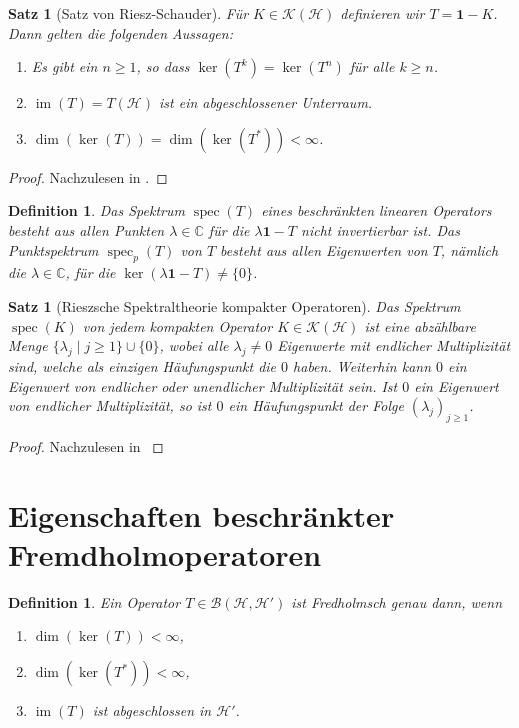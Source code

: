 \documentclass[11pt, hidelinks]{article}
\newcommand{\h}{\mathcal{H}}
\newcommand{\spec}{\operatorname{spec}}
\newcommand{\im}{\operatorname{im}}
\numberwithin{conj}{section}
\newtheorem{definition}[conj]{Definition}
\newtheorem{theorem}[conj]{Satz}
\begin{document}
\begin{theorem}[Satz von Riesz-Schauder]
Für $K \in \mathcal{K}(\h)$ definieren wir $T = \mathbf{1}-K$. Dann gelten die folgenden Aussagen:
\begin{enumerate}
    \item Es gibt ein $n \geq 1$, so dass $\ker(T^k) = \ker(T^n)$ für alle $k \geq n$.
    \item $\im(T) = T(\h)$ ist ein abgeschlossener Unterraum.
    \item $\dim(\ker(T)) = \dim(\ker(T^\ast)) < \infty$.
\end{enumerate}
\end{theorem}

\begin{proof}
Nachzulesen in \cite[Satz VI.2.1, Lemma VI.2.2]{werner2018funktionalanalysis}.
\end{proof}

\begin{definition}
    Das Spektrum $\spec(T)$ eines beschränkten linearen Operators besteht aus allen Punkten $\lambda \in \mathbb{C}$ für die $\lambda \mathbf{1} - T$ nicht invertierbar ist. Das Punktspektrum $\spec_p(T)$ von $T$ besteht aus allen Eigenwerten von $T$, nämlich die $\lambda \in \mathbb{C}$, für die $\ker(\lambda \mathbf{1} - T) \neq \{0\}$.
\end{definition}

\begin{theorem}[Rieszsche Spektraltheorie kompakter Operatoren]
\label{Riesz}
Das Spektrum $\spec(K)$ von jedem kompakten Operator $K \in \mathcal{K}(\h)$ ist eine abzählbare Menge $\{\lambda_j \; \vert \; j \geq 1\} \cup \{0\}$, wobei alle $\lambda_j \neq 0$ Eigenwerte mit endlicher Multiplizität sind, welche als einzigen Häufungspunkt die $0$ haben. Weiterhin kann $0$ ein Eigenwert von endlicher oder unendlicher Multiplizität sein. Ist $0$ ein Eigenwert von endlicher Multiplizität, so ist $0$ ein Häufungspunkt der Folge $(\lambda_j)_{j \geq 1}$.
\end{theorem}

\begin{proof}
Nachzulesen in \cite[VI.2.5]{werner2018funktionalanalysis}
\end{proof}

\section{Eigenschaften beschränkter Fremdholmoperatoren}
\begin{definition}
    Ein Operator $T \in \mathcal{B}(\h,\h')$ ist Fredholmsch genau dann, wenn
    \begin{enumerate}
        \item $\dim(\ker(T)) < \infty$,
        \item $\dim(\ker(T^\ast)) < \infty$,
        \item $\im(T)$ ist abgeschlossen in $\h'$.
    \end{enumerate}
\end{definition}
\end{document}
